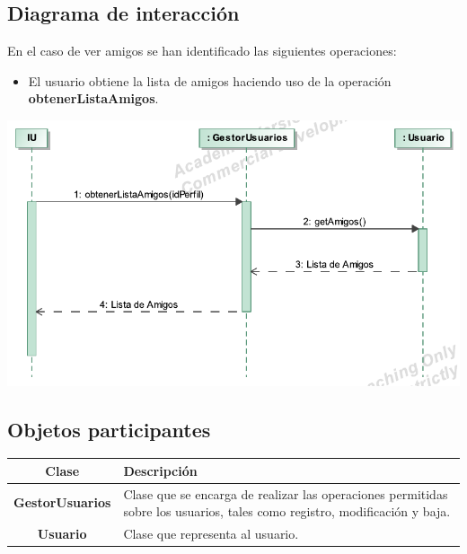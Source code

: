 \documentclass[12pt, a4paper, titlepage]{article}
\begin{document}
\subsection{Diagrama de interacción}

En el caso de {\sc ver amigos } se han identificado las siguientes operaciones:

\begin{itemize}
	\item El usuario obtiene la lista de amigos haciendo uso de la operación \textbf{obtenerListaAmigos}.
\end{itemize}

\begin{center}
	\includegraphics{Imagenes/OperacionObtenerListaAmigos}
\end{center}

\subsection{Objetos participantes}

\begin{center}
\begin{tabular}{|c|p{14cm}|}
	\hline
	\textbf{Clase} & \textbf{Descripción}\\ \hline
	\textbf{GestorUsuarios} &  Clase que se encarga de realizar las operaciones permitidas sobre los usuarios, tales como registro, modificación y baja.\\ \hline
	\textbf{Usuario} & Clase que representa al usuario. \\ \hline
\end{tabular}

\end{center}
\end{document}
